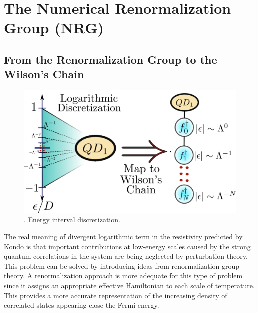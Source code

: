 


\section{The Numerical Renormalization Group\label{sec:The-Numerical-Renormaliztion} (NRG) }

\subsection{From the Renormalization Group to the Wilson's Chain \label{subsec:Logarithmic}}

\begin{figure}[hbt]
\centering
\includegraphics[scale=0.45]{IMAGES/DQD/NRG-Final.png}\caption{\label{fig:Discretization}.
Energy interval discretization. \protect{} }
\end{figure}

 The real meaning of divergent logarithmic term in the resistivity predicted by Kondo is that important contributions at low-energy scales caused by the strong quantum correlations in the system are being neglected by perturbation theory. This problem can be solved by introducing ideas from renormalization group theory. A renormalization approach is more adequate for this type of problem since it assigns an appropriate effective Hamiltonian to each scale of temperature. This provides a more accurate representation of the increasing density of correlated states appearing close the Fermi energy. 

